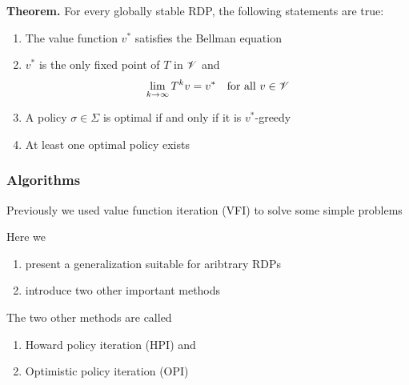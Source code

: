 \begin{frame}
    

    {\bf Theorem.} For every globally stable RDP, the following statements are true:
    \begin{enumerate}
        \item The value function $v^*$ satisfies the Bellman equation
            \vspace{1em}
        \item $v^*$ is the only fixed point of $T$ in
            $\mathscr V$ and 
            \begin{equation*}
                \lim_{k \to \infty} T^k v = v^*
                \quad \text{for all } v \in \mathscr V
            \end{equation*}
        \item A policy $\sigma \in \Sigma$ is optimal if and only if it is
            $v^*$-greedy
            \vspace{1em}
        \item At least one optimal policy exists
    \end{enumerate}

\end{frame}



\begin{frame}
    \frametitle{Algorithms}

    Previously we used value function iteration (VFI) to solve some simple
    problems

    \vspace{0.5em}
    \vspace{0.5em}
    Here we
    \begin{enumerate}
        \item present a generalization suitable for aribtrary RDPs
    \vspace{0.5em}
        \item introduce two other important methods
    \end{enumerate}

    \vspace{0.5em}
    The two other methods are called
    \begin{enumerate}
        \item Howard policy iteration (HPI) and
    \vspace{0.5em}
        \item Optimistic policy iteration (OPI)
    \end{enumerate}


\end{frame}


